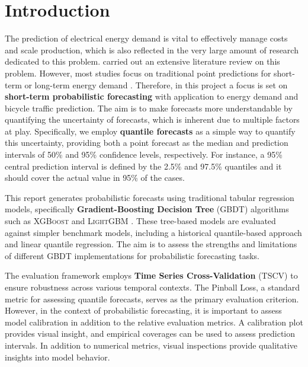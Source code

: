 \section{Introduction}
\label{ch:Introduction}

The prediction of electrical energy demand is vital to effectively manage costs and scale production, which is also reflected in the very large amount of research dedicated to this problem. \Cite{nti_electricity_2020} carried out an extensive literature review on this problem. However, most studies focus on traditional point predictions for short-term or long-term energy demand \parencite[915]{hong_probabilistic_2016}. Therefore, in this project a focus is set on \textbf{short-term probabilistic forecasting} with application to energy demand and bicycle traffic prediction. The aim is to make forecasts more understandable by quantifying the uncertainty of forecasts, which is inherent due to multiple factors at play. Specifically, we employ \textbf{quantile forecasts} as a simple way to quantify this uncertainty, providing both a point forecast as the median and prediction intervals of 50\% and 95\% confidence levels, respectively. For instance, a 95\% central prediction interval is defined by the 2.5\% and 97.5\% quantiles and it should cover the actual value in 95\% of the cases.

This report generates probabilistic forecasts using traditional tabular regression models, specifically \textbf{Gradient-Boosting Decision Tree} (GBDT) algorithms such as \textsc{XGBoost} \parencite{chen_xgboost_2016} and \textsc{LightGBM} \parencite{ke_lightgbm_2017}. These tree-based models are evaluated against simpler benchmark models, including a historical quantile-based approach and linear quantile regression. The aim is to assess the strengths and limitations of different GBDT implementations for probabilistic forecasting tasks.

The evaluation framework employs \textbf{Time Series Cross-Validation} (TSCV) to ensure robustness across various temporal contexts. The Pinball Loss, a standard metric for assessing quantile forecasts, serves as the primary evaluation criterion. However, in the context of probabilistic forecasting, it is important to assess model calibration in addition to the relative evaluation metrics. A calibration plot provides visual insight, and empirical coverages can be used to assess prediction intervals.
In addition to numerical metrics, visual inspections provide qualitative insights into model behavior.

